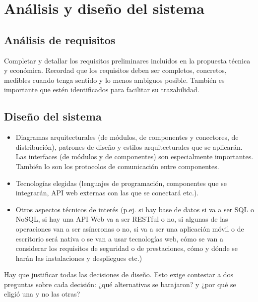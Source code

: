 
\chapter{Análisis y diseño del sistema} %

\label{Chapter4} %

\section{Análisis de requisitos}
Completar y detallar los requisitos preliminares incluidos en la propuesta técnica y económica. Recordad que los requisitos deben ser completos, concretos, medibles cuando tenga sentido y lo menos ambiguos posible. También es importante que estén identificados para facilitar su trazabilidad.

\section{Diseño del sistema}
\begin{itemize}
	\item Diagramas arquitecturales (de módulos, de componentes y conectores, de distribución), patrones de diseño y estilos arquitecturales que se aplicarán. Las interfaces (de módulos y de componentes) son especialmente importantes. También lo son los protocolos de comunicación entre componentes.
	\item Tecnologías elegidas (lenguajes de programación, componentes que se integrarán, API web externas con las que se conectará etc.).
	\item Otros aspectos técnicos de interés (p.ej. si hay base de datos si va a ser SQL o NoSQL, si hay una API Web va a ser RESTful o no, si algunas de las operaciones van a ser asíncronas o no, si va a ser una aplicación móvil o de escritorio será nativa o se van a usar tecnologías web, cómo se van a considerar los requisitos de seguridad o de prestaciones, cómo y dónde se harán las instalaciones y despliegues etc.)
\end{itemize}

Hay que justificar todas las decisiones de diseño. Esto exige contestar a dos preguntas sobre cada decisión: ¿qué alternativas se barajaron? y ¿por qué se eligió una y no las otras?
